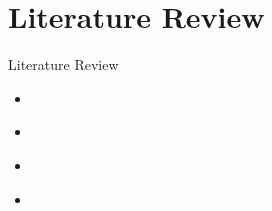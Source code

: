 \section{Literature Review}
\begin{frame}[allowframebreaks]{Literature Review}
\justifying

\begin{itemize}
    \item {} \cite{azizi2021tminer}
    \item {} \cite{gao2019strip}
    \item {} \cite{chen2021identification}
    \item {} \cite{shao2021poisonedrecog}
\end{itemize}






\end{frame}